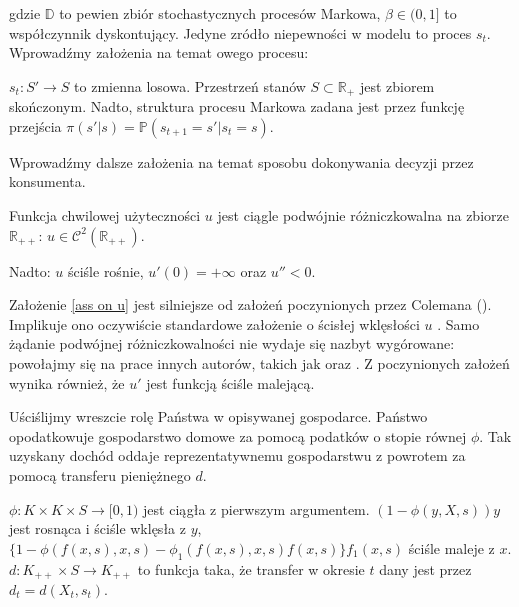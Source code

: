 gdzie $ \mathbb{D} $ to pewien zbiór stochastycznych procesów Markowa, $ \beta \in (0,1]$ to współczynnik dyskontujący. Jedyne zródło niepewności w modelu to proces $ s_t $. Wprowadźmy założenia na temat owego procesu:

\begin{ass}
$ s_t : S' \rightarrow S$ to zmienna losowa. Przestrzeń stanów $ S \subset \mathbb{R}_{+}$ jest zbiorem skończonym. Nadto, struktura procesu Markowa zadana jest przez funkcję przejścia $ \pi(s'|s) = \mathbb{P}( s_{t+1} = s' | s_t = s) $. 
\end{ass}

Wprowadźmy dalsze założenia na temat sposobu dokonywania decyzji przez konsumenta.

\begin{ass}\label{ass on u}
 Funkcja chwilowej użyteczności $ u $ jest ciągle podwójnie różniczkowalna na zbiorze $ \mathbb{R}_{++} $: $ u \in \mathcal{C}^{2}(\mathbb{R}_{++})$.
 
Nadto: $ u $ ściśle rośnie, $ u'(0) = +\infty $ oraz $ u'' < 0 $.
\end{ass}

Założenie \ref{ass on u} jest silniejsze od założeń poczynionych przez Colemana (\citeyear{Coleman1, Coleman2}). Implikuje ono oczywiście standardowe założenie o ścisłej wklęsłości $ u $ \citep[patrz:][str. 38]{Avriel}. Samo żądanie podwójnej różniczkowalności nie wydaje się nazbyt wygórowane: powołajmy się na prace innych autorów, takich jak \citet{Greenwood} oraz \cite{Reffett}. Z poczynionych założeń wynika również, że $ u' $ jest funkcją ściśle malejącą. 

	Uściślijmy wreszcie rolę Państwa w opisywanej gospodarce. Państwo opodatkowuje gospodarstwo domowe za pomocą podatków o stopie równej $ \phi $. Tak uzyskany dochód oddaje reprezentatywnemu gospodarstwu z powrotem za pomocą transferu pieniężnego $ d $. 

\begin{ass}\label{ass_on_R}
	$ \phi : K \times K \times S \rightarrow [0,1) $ jest ciągła z pierwszym argumentem. $ (1 - \phi(y,X,s))y $ jest rosnąca i ściśle wklęsła z $ y $, $ \bigl\{ 1- \phi(f(x,s),x,s) - \phi_1 (f(x,s),x,s)f(x,s) \bigl\}f_1 (x,s) $ ściśle maleje z $ x $. $ d: K_{++} \times S \rightarrow K_{++} $ to funkcja taka, że transfer w okresie $ t $ dany jest przez $ d_t = d(X_t,s_t) $.
\end{ass}

